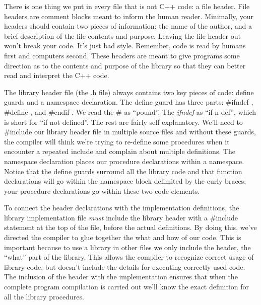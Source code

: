 \documentclass[]{tufte-handout}
\begin{document}
There is one thing we put in every file that is not C++ code: a file header. File headers are comment blocks meant to inform the human reader. Minimally, your headers should contain two pieces of information: the name of the author, and a brief description of the file contents and purpose. Leaving the file header out won't break your code. It's just bad style.  Remember, code is read by humans first and computers second. These headers  are meant to give programs some direction as to the contents and purpose of the library so that they can better read and interpret the C++ code.

The library header file (the .h file) always contains two key pieces of code: define guards and a namespace declaration. The define guard has three parts: \#ifndef , \#define , and \#endif . We read the \# as ``pound''. The \textit{ifndef} as ``if n def'', which is short for ``if not defined''. The rest are fairly self explanatory. We'll need to \#include our library header file in multiple source files and without these guards, the compiler will think we're trying to re-define some procedures when it encounter a repeated include and complain about multiple definitions.  The namespace declaration places our procedure declarations within a namespace. Notice that the define guards surround all the library code and that function declarations will go within the namespace block delimited by the curly braces; your procedure declarations go within these two code elements.

To connect the header declarations with the implementation definitions, the library implementation file \textit{must} include the library header with a \#include statement at the top of the file, before the actual definitions. By doing this, we've directed the compiler to glue together the what and how of our code. This is important because to use a library in other files we only include the header, the ``what'' part of the library. This allows the compiler to recognize correct usage of library code, but doesn't include the details for executing correctly used code. The inclusion of the header with the implementation ensures that when the complete program compilation is carried out we'll know the exact definition for all the library procedures. 
\end{document}
